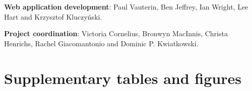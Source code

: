 \documentclass[a4paper,11pt,abstracton,hidelinks]{scrartcl}
\newcommand{\beginsupplement}{%
  \setcounter{table}{0}
  \renewcommand{\thetable}{S\arabic{table}}%
  \setcounter{figure}{0}
  \renewcommand{\thefigure}{S\arabic{figure}}%
}
\begin{document}
%
\textbf{Web application development}: Paul Vauterin, Ben Jeffrey, Ian Wright, Lee Hart and Krzysztof Kluczy\'{n}ski.

%
\textbf{Project coordination}: Victoria Cornelius, Bronwyn MacInnis, Christa Henrichs, Rachel Giacomantonio and Dominic P. Kwiatkowski.







\beginsupplement

\section*{Supplementary tables and figures}

%


\clearpage
\end{document}

